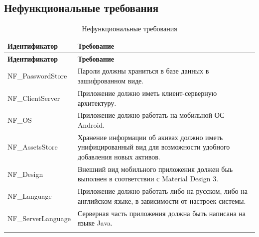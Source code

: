 \documentclass[a4paper, 14pt]{article}
\begin{document}
\subsection{Нефункциональные требования}

\begin{longtable}{| p{} | p{} |}
    \hline
    \textbf{Идентификатор} & \textbf{Требование}                                                                                               \\
    \hline
    \endfirsthead
    \hline
    \textbf{Идентификатор} & \textbf{Требование}                                                                                               \\
    \hline
    \endhead


    NF\_PasswordStore      & Пароли должны храниться в базе данных в зашифрованном виде.                                                       \\ \hline
    NF\_ClientServer       & Приложение должно иметь клиент-серверную архитектуру.                                                             \\ \hline
    NF\_OS                 & Приложение должно работать на мобильной ОС Android.                                                               \\ \hline
    NF\_AssetsStore        & Хранение информации об акивах должно иметь унифицированный вид для возможности удобного добавления новых активов. \\ \hline
    NF\_Design             & Внешний вид мобильного приложения должен быь выполнен в соответствии с Material Design 3.                         \\ \hline
    NF\_Language           & Приложение должно работать либо на русском, либо на английском языке, в зависимости от настроек системы.          \\ \hline
    NF\_ServerLanguage     & Серверная часть приложения должна быть написана на языке Java.                                                    \\ \hline
    \caption{Нефункциональные требования}
\end{longtable}
\end{document}

